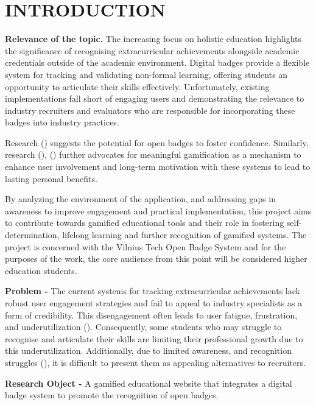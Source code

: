 \section*{INTRODUCTION}
%
\textbf{Relevance of the topic.} The increasing focus on holistic education highlights the significance of recognising extracurricular achievements alongside academic credentials outside of the academic environment. 
Digital badges provide a flexible system for tracking and validating non-formal learning, offering students an opportunity to articulate their skills effectively. 
Unfortunately, existing implementations fall short of engaging users and demonstrating the relevance to industry recruiters and evaluators who are responsible for incorporating these badges into industry practices.

Research (\cite {Stefaniak_and_Carey}) suggests the potential for open badges to foster confidence. 
Similarly, research (\cite{definition}), (\cite{nicholson2015}) further advocates for meaningful gamification as a mechanism to enhance user involvement and long-term motivation with these systems to lead to lasting personal benefits.

By analyzing the environment of the application, and addressing gaps in awareness to improve engagement and practical implementation, this project aims to contribute towards gamified educational tools and their role in fostering self-determination, lifelong learning and further recognition of gamified systems. 
The project is concerned with the Vilnius Tech Open Badge System and for the purposes of the work, the core audience from this point will be considered higher education students.

\textbf{Problem -} The current systems for tracking extracurricular achievements lack robust user engagement strategies and fail to appeal to industry specialists as a form of credibility.
This disengagement often leads to user fatigue, frustration, and underutilization (\cite {FunaAndAaron}). 
Consequently, some students who may struggle to recognise and articulate their skills are limiting their professional growth due to this underutilization.
Additionally, due to limited awareness, and recognition struggles (\cite {federalIssues}), it is difficult to present them as appealing alternatives to recruiters.

\textbf{Research Object -} A gamified educational website that integrates a digital badge system to promote the recognition of open badges.

